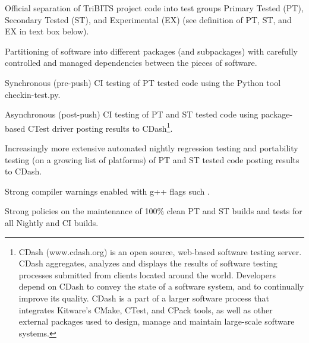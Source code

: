 \documentclass[11pt]{SANDreport}
\begin{document}
\begin{compactitem}

{}\item Official separation of TriBITS project code into test groups Primary Tested (PT), Secondary Tested (ST), and Experimental (EX) (see definition of PT, ST, and EX in text box below).

{}\item Partitioning of software into different packages (and subpackages) with carefully controlled and managed dependencies between the pieces of software.

{}\item Synchronous (pre-push) CI testing of PT tested code using the Python tool checkin-test.py.

{}\item Asynchronous (post-push) CI testing of PT and ST tested code using package-based CTest driver posting results to CDash\footnote{CDash (www.cdash.org) is an open source, web-based software testing server. CDash aggregates, analyzes and displays the results of software testing processes submitted from clients located around the world. Developers depend on CDash to convey the state of a software system, and to continually improve its quality. CDash is a part of a larger software process that integrates Kitware's CMake, CTest, and CPack tools, as well as other external packages used to design, manage and maintain large-scale software systems.}.

{}\item Increasingly more extensive automated nightly regression testing and portability testing (on a growing list of platforms) of PT and ST tested code posting results to CDash.

{}\item Strong compiler warnings enabled with g++ flags such     .

{}\item Strong policies on the maintenance of 100\% clean PT and ST builds and tests for all Nightly and CI builds.

\end{compactitem}
\end{document}
